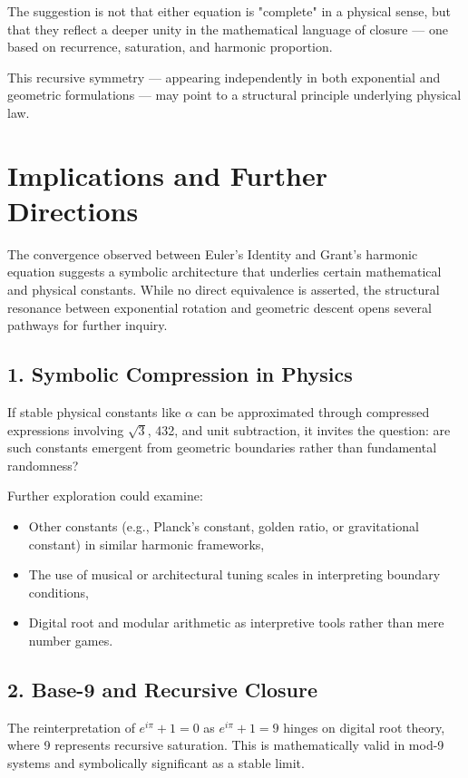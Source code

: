\documentclass[12pt]{article}
\begin{document}
The suggestion is not that either equation is "complete" in a physical sense, but that they reflect a deeper unity in the mathematical language of closure — one based on recurrence, saturation, and harmonic proportion.

This recursive symmetry — appearing independently in both exponential and geometric formulations — may point to a structural principle underlying physical law.

\section{Implications and Further Directions}

The convergence observed between Euler’s Identity and Grant’s harmonic equation suggests a symbolic architecture that underlies certain mathematical and physical constants. While no direct equivalence is asserted, the structural resonance between exponential rotation and geometric descent opens several pathways for further inquiry.

\subsection*{1. Symbolic Compression in Physics}

If stable physical constants like \(\alpha\) can be approximated through compressed expressions involving \(\sqrt{3}\), 432, and unit subtraction, it invites the question: are such constants emergent from geometric boundaries rather than fundamental randomness?

Further exploration could examine:

\begin{itemize}[leftmargin=1.5em]
    \item Other constants (e.g., Planck's constant, golden ratio, or gravitational constant) in similar harmonic frameworks,
    \item The use of musical or architectural tuning scales in interpreting boundary conditions,
    \item Digital root and modular arithmetic as interpretive tools rather than mere number games.
\end{itemize}

\subsection*{2. Base-9 and Recursive Closure}

The reinterpretation of \( e^{i\pi} + 1 = 0 \) as \( e^{i\pi} + 1 = 9 \) hinges on digital root theory, where 9 represents recursive saturation. This is mathematically valid in mod-9 systems and symbolically significant as a stable limit.
\end{document}
